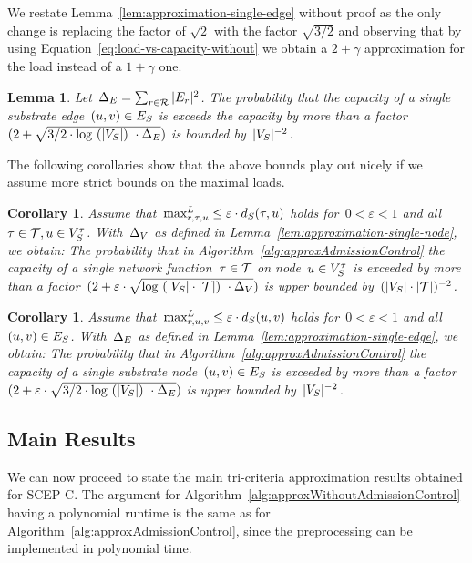 \documentclass[10pt, conference, letterpaper]{IEEEtran}
\newtheorem{lemma}[theorem]{Lemma}
\newtheorem{corollary}[theorem]{Corollary}
\begin{document}
We restate Lemma~\ref{lem:approximation-single-edge} without proof as the only change is replacing the factor of  $\sqrt{2}$ with the factor $\sqrt{3/2}$ and
observing that by using Equation~\ref{eq:load-vs-capacity-without} we obtain a $2+\gamma$ approximation for the load instead of a $1+\gamma$ one.

\begin{lemma}
\label{lem:approximation-single-edge-without}
Let~$\Delta_E = \sum_{r \in \mathcal{R}} |E_{r}|^2$. The probability that the capacity of a single substrate edge~$(u,v) \in  E_S$ is exceeds the capacity by more than a factor~$(2+\sqrt{3/2\cdot\log~(|V_S|)~\cdot \Delta_E})$ is bounded by~$|V_S|^{-2}$.
\end{lemma}

The following corollaries show that the above bounds play out nicely if 
we assume more strict bounds on the maximal loads.

\begin{corollary}
Assume that~$\maxLoadV \leq \varepsilon \cdot \Scap(\type, u)$ holds for~$0 < \varepsilon < 1$ and all~$\tau \in \mathcal{T}, u \in V^{\tau}_{S}$. With~$\Delta_V$ as defined in Lemma~\ref{lem:approximation-single-node}, we obtain:
The probability that in Algorithm~\ref{alg:approxAdmissionControl} the capacity of a single network function~$\tau \in \mathcal{T}$ on node~$u \in V^{\tau}_{S}$ is exceeded by more than a factor~$(2+ \varepsilon \cdot \sqrt{\log~(|V_S|\cdot|\mathcal{T}|)~\cdot \Delta_V})$ is upper bounded by~$(|V_S| \cdot |\mathcal{T}|)^{-2}$.
\end{corollary}

\begin{corollary}
Assume that~$\maxLoadE \leq \varepsilon \cdot \Scap(u,v)$ holds for~$0 < \varepsilon < 1$ and all~$(u,v) \in  E_S$. With~$\Delta_E$ as defined in Lemma~\ref{lem:approximation-single-edge}, we obtain:
The probability that in Algorithm~\ref{alg:approxAdmissionControl} the capacity of a single substrate node~$(u,v) \in  E_S$ is exceeded by more than a factor~$(2+\varepsilon \cdot \sqrt{3/2\cdot \log~(|V_S|)~\cdot \Delta_E})$ is upper bounded by~$|V_S|^{-2}$.
\end{corollary}


\subsection{Main Results}
\label{sec:main-results-without-admission-control}

We can now proceed to state the main tri-criteria approximation results obtained for SCEP-C. The argument for Algorithm~\ref{alg:approxWithoutAdmissionControl} having a polynomial runtime is the same as for Algorithm~\ref{alg:approxAdmissionControl}, since the preprocessing can be implemented in polynomial time. 
\end{document}
